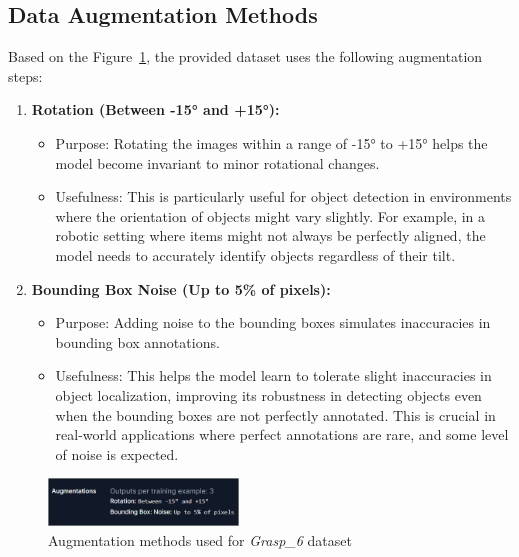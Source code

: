 \documentclass[conference]{IEEEtran}
\begin{document}
\subsection{Data Augmentation Methods}
Based on the Figure~\ref{fig:prob3-b}, the provided dataset uses the following augmentation steps:
\begin{enumerate}
  \item \textbf{Rotation (Between -15° and +15°):}
        \begin{itemize}
          \item Purpose: Rotating the images within a range of -15° to +15° helps the model become invariant to minor rotational changes.
          \item Usefulness: This is particularly useful for object detection in environments where the orientation of objects might vary slightly. For example, in a robotic setting where items might not always be perfectly aligned, the model needs to accurately identify objects regardless of their tilt.
        \end{itemize}
  \item \textbf{Bounding Box Noise (Up to 5\% of pixels):}
        \begin{itemize}
          \item Purpose: Adding noise to the bounding boxes simulates inaccuracies in bounding box annotations.
          \item Usefulness: This helps the model learn to tolerate slight inaccuracies in object localization, improving its robustness in detecting objects even when the bounding boxes are not perfectly annotated. This is crucial in real-world applications where perfect annotations are rare, and some level of noise is expected.
        \end{itemize}
\end{enumerate}

\begin{figure}[htbp]
  \centering
  \includegraphics[width=0.45\textwidth]{figures/prob3-b.png}
  \caption{Augmentation methods used for \textit{Grasp\_6} dataset}
  \label{fig:prob3-b}
\end{figure}
\end{document}
